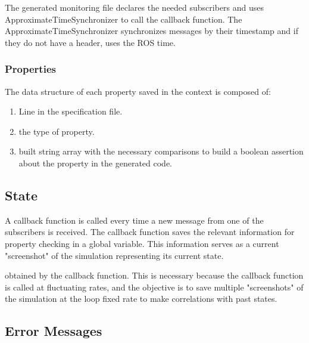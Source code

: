 The generated monitoring file declares the needed subscribers and uses ApproximateTimeSynchronizer to call the callback function. The ApproximateTimeSynchronizer synchronizes messages by their timestamp and if they do not have a header, uses the ROS time.


\subsubsection{Properties}
\label{sssec:compileProp}


The data structure of each property saved in the context is composed of:

\begin{enumerate}
    \item Line in the specification file.
    \item the type of property.
    \item built string array with the necessary comparisons to build a boolean assertion about the property in the generated code.
\end{enumerate}


\subsection{State}
\label{ssec:compileState}


A callback function is called every time a new message from one of the subscribers is received. The callback function saves the relevant information for property checking in a global variable. This information serves as a current "screenshot" of the simulation representing its current state.

obtained by the callback function. This is necessary because the callback function is called at fluctuating rates, and the objective is to save multiple "screenshots" of the simulation at the loop fixed rate to make correlations with past states.


\subsection{Error Messages}
\label{ssec:errormessages}

